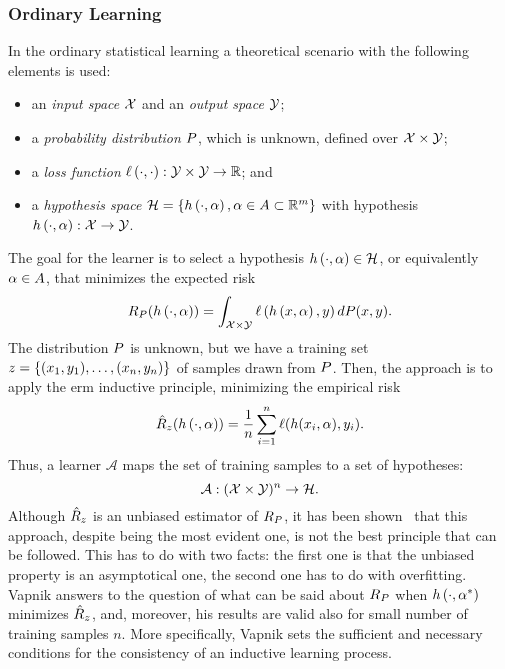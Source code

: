 \subsubsection*{Ordinary Learning}
In the ordinary statistical learning a theoretical scenario with the following elements is used:
\begin{itemize}
    \item an \emph{input space} $\mathcal{X}$ and an \emph{output space} $\mathcal{Y}$;
    \item a \emph{probability distribution} $P$, which is unknown, defined over $\mathcal{X} \times \mathcal{Y}$;
    \item a \emph{loss function} $\ell\left( \cdot, \cdot\right):\mathcal{Y} \times \mathcal{Y} \to \mathbb{R}$; and
    \item a \emph{hypothesis space} $\mathcal{H} = \left\{h\left(\cdot, \alpha\right), \alpha \in A \subset \mathbb{R}^m\right\}$ with hypothesis $h\left(\cdot, \alpha\right): \mathcal{X} \to \mathcal{Y}$.
\end{itemize}
The goal for the learner is to select a hypothesis $h\left(\cdot, \alpha\right) \in \mathcal{H}$, or equivalently $\alpha \in A$, that minimizes the expected risk
$$ R_P(h\left(\cdot, \alpha\right)) =  \int_{\mathcal{X} \times \mathcal{Y}} \ell\left( h\left(x, \alpha\right), y\right) dP(x, y) .$$
The distribution $P$ is unknown, but we have a training set $z = \{(x_1, y_1), \ldots, (x_n, y_n)\}$ of samples drawn from $P$. 
Then, the approach is to apply the \acrshort{erm} inductive principle, minimizing the empirical risk
$$ \hat{R}_z(h\left(\cdot, \alpha\right)) = \frac{1}{n} \sum_{i=1}^n \ell(h(x_i, \alpha), y_i).$$
Thus, a learner $\mathcal{A}$ maps the set of training samples to a set of hypotheses:
\begin{equation}
    \nonumber
    \mathcal{A} : {(\mathcal{X} \times \mathcal{Y})^n} \to \mathcal{H}.
\end{equation}
Although $\hat{R}_z$ is an unbiased estimator of $R_P$, it has been shown~\citep{Vapnik00} that this approach, despite being the most evident one, is not the best principle that can be followed.
This has to do with two facts: the first one is that the unbiased property is an asymptotical one, the second one has to do with overfitting.
Vapnik answers to the question of what can be said about $R_P$ when $h\left(\cdot, \alpha^*\right)$ minimizes $\hat{R}_z$, and, moreover, his results are valid also for small number of training samples $n$.
More specifically, Vapnik sets the sufficient and necessary conditions for the consistency of an inductive learning process.
